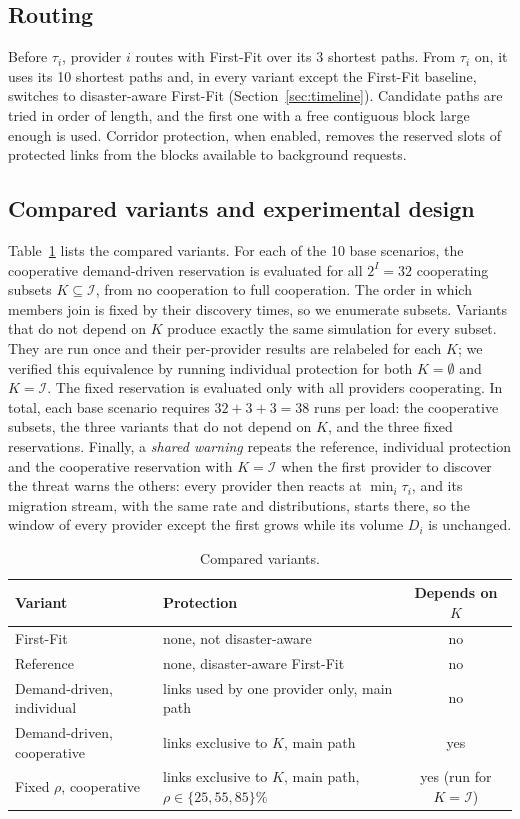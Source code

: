 \documentclass[11pt,a4paper]{article}
\theoremstyle{definition}
\begin{document}
\subsection{Routing}

Before $\tau_i$, provider $i$ routes with First-Fit over its 3 shortest paths.
From $\tau_i$ on, it uses its 10 shortest paths and, in every variant except the First-Fit baseline, switches to disaster-aware First-Fit (Section~\ref{sec:timeline}).
Candidate paths are tried in order of length, and the first one with a free contiguous block large enough is used.
Corridor protection, when enabled, removes the reserved slots of protected links from the blocks available to background requests.

\subsection{Compared variants and experimental design}

Table~\ref{tab:variants} lists the compared variants.
For each of the 10 base scenarios, the cooperative demand-driven reservation is evaluated for all $2^I=32$ cooperating subsets $K\subseteq\mathcal{I}$, from no cooperation to full cooperation.
The order in which members join is fixed by their discovery times, so we enumerate subsets.
Variants that do not depend on $K$ produce exactly the same simulation for every subset.
They are run once and their per-provider results are relabeled for each $K$; we verified this equivalence by running individual protection for both $K=\emptyset$ and $K=\mathcal{I}$.
The fixed reservation is evaluated only with all providers cooperating.
In total, each base scenario requires $32+3+3=38$ runs per load: the cooperative subsets, the three variants that do not depend on $K$, and the three fixed reservations.
Finally, a \emph{shared warning} repeats the reference, individual protection and the cooperative reservation with $K=\mathcal{I}$ when the first provider to discover the threat warns the others: every provider then reacts at $\min_i\tau_i$, and its migration stream, with the same rate and distributions, starts there, so the window of every provider except the first grows while its volume $D_i$ is unchanged.

\begin{table}[htbp]
\centering
\small
\caption{Compared variants.}
\label{tab:variants}
\begin{tabular}{@{}llc@{}}
\toprule
Variant & Protection & Depends on $K$ \\
\midrule
First-Fit & none, not disaster-aware & no \\
Reference & none, disaster-aware First-Fit & no \\
Demand-driven, individual & links used by one provider only, main path & no \\
Demand-driven, cooperative & links exclusive to $K$, main path & yes \\
Fixed $\rho$, cooperative & links exclusive to $K$, main path, $\rho\in\{25,55,85\}\%$ & yes (run for $K=\mathcal{I}$) \\
\bottomrule
\end{tabular}
\end{table}
\end{document}
